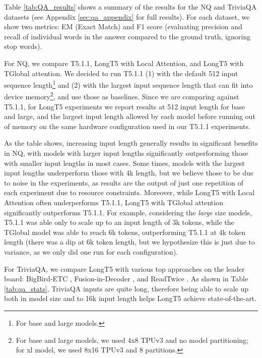 \documentclass[11pt]{article}
\begin{document}
Table \ref{tab:QA_results} shows a summary of the results for the NQ and TriviaQA datasets (see Appendix \ref{sec:qa_appendix} for full results). For each dataset, we show two metrics: EM (Exact Match) and F1 score (evaluating precision and recall of individual words in the answer compared to the ground truth, ignoring stop words). 

For NQ, we compare T5.1.1, LongT5 with Local Attention, and LongT5 with TGlobal attention. We decided to run T5.1.1 (1) with the default 512 input sequence length\footnote{For base and large models.} and (2) with the largest input sequence length that can fit into device memory\footnote{For base and large models, we used 4x8 TPUv3 and no model partitioning; for xl model, we used 8x16 TPUv3 and 8 partitions.}, and use those as baselines. Since we are comparing against T5.1.1, for LongT5 experiments we report results at 512 input length for base and large, and the largest input length allowed by each model before running out of memory on the same hardware configuration used in our T5.1.1 experiments.

As the table shows, increasing input length generally results in significant benefits in NQ, with models with larger input lengths significantly outperforming those with smaller input lengths in most cases. Some times, models with the largest input lengths underperform those with 4k length, but we believe those to be due to noise in the experiments, as results are the output of just one repetition of each experiment due to resource constraints. Moreover,
while LongT5 with Local Attention often underperforms T5.1.1, LongT5 with TGlobal attention significantly outperforms T5.1.1. For example, considering the {\em large} size models, T5.1.1 was able only to scale up to an input length of 3k tokens, while the TGlobal model was able to reach 6k tokens, outperforming T5.1.1 at 4k token length (there was a dip at 6k token length, but we hypothesize this is just due to variance, as we only did one run for each configuration).

For TriviaQA, we compare LongT5 with various top approaches on the leader board: BigBird-ETC \cite{bigbird}, Fusion-in-Decoder \cite{fid}, and ReadTwice \cite{readtwice}. As shown in Table \ref{tab:qa_stats}, TriviaQA inputs are quite long, therefore being able to scale up both in model size and to 16k input length helps LongT5 achieve state-of-the-art.
\end{document}

